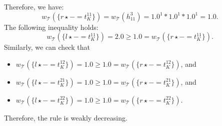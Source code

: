 \begin{example}
\begin{center}
      \end{center}
    Therefore, we have: $$w_\mathcal{T}(\{r \mathop{\star} - \mathop{=} t_K^{11}\}) \mathop{=} w_\mathcal{T}(h_{11}^3) \mathop{=} 1.0^1 * 1.0^1 * 1.0 ^ 1 \mathop{=} 1.0.$$
    The following inequality holds:
    $$w_\mathcal{T}(\{l \mathop{\star} - \mathop{=} t_K^{11}\}) \mathop{=} 2.0 \mathop{\geq} 1.0 \mathop{=} w_\mathcal{T}(\{r \mathop{\star} - \mathop{=} t_K^{11}\}).$$
    Similarly, we can check that 
        \begin{itemize}
            \item $w_\mathcal{T}(\{l \mathop{\star} - \mathop{=} t_K^{12}\}) \mathop{=} 1.0 \mathop{\geq} 1.0 \mathop{=} w_\mathcal{T}(\{r \mathop{\star} - \mathop{=} t_K^{12}\})$, and
            \item $w_\mathcal{T}(\{l \mathop{\star} - \mathop{=} t_K^{21}\}) \mathop{=} 1.0 \mathop{\geq} 1.0 \mathop{=} w_\mathcal{T}(\{r \mathop{\star} - \mathop{=} t_K^{21}\})$, and
            \item $w_\mathcal{T}(\{l \mathop{\star} - \mathop{=} t_K^{22}\}) \mathop{=} 1.0 \mathop{\geq} 1.0 \mathop{=} w_\mathcal{T}(\{r \mathop{\star} - \mathop{=} t_K^{22}\})$.
        \end{itemize}
    Therefore, the rule is weakly decreasing.
    

\end{example}
